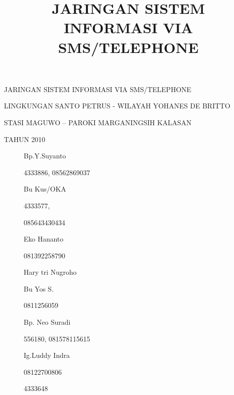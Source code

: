 \documentclass{article}
\title{JARINGAN SISTEM INFORMASI VIA SMS/TELEPHONE}
\begin{document}
JARINGAN SISTEM INFORMASI VIA SMS/TELEPHONE 

LINGKUNGAN SANTO PETRUS - WILAYAH YOHANES DE BRITTO 

STASI MAGUWO -- PAROKI MARGANINGSIH KALASAN 

TAHUN 2010


\begin{figure}
\centering
\begin{minipage}{3.17cm}
Bp.Y.Suyanto

4333886, 08562869037

\end{minipage}
\end{figure}
\begin{figure}
\centering
\begin{minipage}{3.17cm}
Bu Kus/OKA

4333577,  

085643430434
\end{minipage}
\end{figure}
\begin{figure}
\centering
\begin{minipage}{3.069cm}
Eko Hananto

081392258790
\end{minipage}
\end{figure}
\begin{figure}
\centering
\begin{minipage}{2.868cm}
Hary tri Nugroho

\end{minipage}
\end{figure}
\begin{figure}
\centering
\begin{minipage}{2.868cm}
Bu Yos S.

0811256059
\end{minipage}
\end{figure}
\begin{figure}
\centering
\begin{minipage}{3.069cm}
Bp. Neo Suradi

556180, 081578115615

\end{minipage}
\end{figure}
\begin{figure}
\centering
\begin{minipage}{3.17cm}
Ig.Luddy Indra

08122700806

4333648
\end{minipage}
\end{figure}
\end{document}
